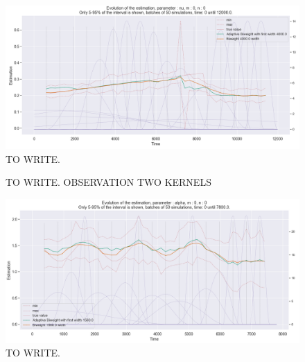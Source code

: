 \begin{figure}
\centering
\includegraphics[width = 0.90 \textwidth]{../imag/chap3/3/L.png}
\caption{TO WRITE.}
\label{fig:first_estimate_3_nu}
\end{figure}















\begin{figure}
\centering
{} 
\caption{TO WRITE. OBSERVATION TWO KERNELS}
\label{fig:TEST}
\end{figure}

\begin{figure}
\centering
\includegraphics[width = 0.90 \textwidth]{../imag/chap3/4/M.png}
\caption{TO WRITE.}
\label{fig:first_estimate_4_alpha}
\end{figure}

